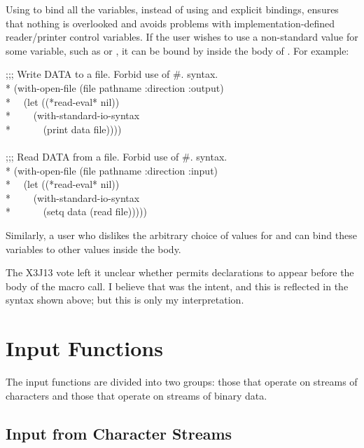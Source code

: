 \begin{defmac}
Using  to bind all the variables,
  instead of using  and explicit bindings,
  ensures that nothing is overlooked and avoids problems with
  implementation-defined reader/printer control variables.
  If the user wishes to use a non-standard value for some variable, such as
   or , it can be bound by  inside the body of
  .  For example:
\begin{lisp}
;;; Write DATA to a file.  Forbid use of \#. syntax. \\*
(with-open-file (file pathname :direction :output) \\*
~~(let ((*read-eval* nil)) \\*
~~~~(with-standard-io-syntax \\*
~~~~~~(print data file)))) \\
\\
;;; Read DATA from a file.  Forbid use of \#. syntax. \\*
(with-open-file (file pathname :direction :input) \\*
~~(let ((*read-eval* nil)) \\*
~~~~(with-standard-io-syntax \\*
~~~~~~(setq data (read file)))))
\end{lisp}
Similarly, a user who dislikes the
  arbitrary choice of values for  and 
  can bind these variables to other values inside the body.

The X3J13 vote left it unclear whether 
permits declarations to appear before the body of the macro call.
I believe that was the intent, and this is reflected in the syntax shown above;
but this is only my interpretation.
\end{defmac}

\section{Input Functions}

The input functions are divided into two groups: those that
operate on streams of characters and those that operate on
streams of binary data.

\subsection{Input from Character Streams}
\label{CHARACTER-INPUT-SECTION}


